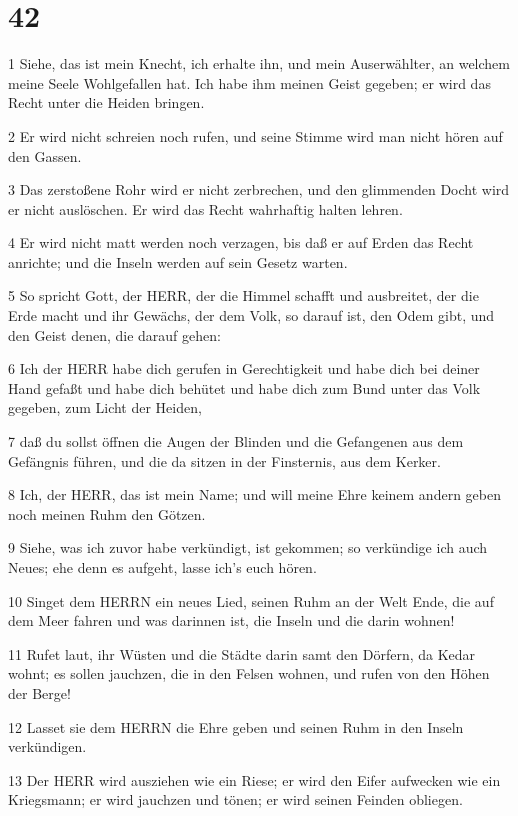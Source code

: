 \chapter{42}

\par 1 Siehe, das ist mein Knecht, ich erhalte ihn, und mein Auserwählter, an welchem meine Seele Wohlgefallen hat. Ich habe ihm meinen Geist gegeben; er wird das Recht unter die Heiden bringen.
\par 2 Er wird nicht schreien noch rufen, und seine Stimme wird man nicht hören auf den Gassen.
\par 3 Das zerstoßene Rohr wird er nicht zerbrechen, und den glimmenden Docht wird er nicht auslöschen. Er wird das Recht wahrhaftig halten lehren.
\par 4 Er wird nicht matt werden noch verzagen, bis daß er auf Erden das Recht anrichte; und die Inseln werden auf sein Gesetz warten.
\par 5 So spricht Gott, der HERR, der die Himmel schafft und ausbreitet, der die Erde macht und ihr Gewächs, der dem Volk, so darauf ist, den Odem gibt, und den Geist denen, die darauf gehen:
\par 6 Ich der HERR habe dich gerufen in Gerechtigkeit und habe dich bei deiner Hand gefaßt und habe dich behütet und habe dich zum Bund unter das Volk gegeben, zum Licht der Heiden,
\par 7 daß du sollst öffnen die Augen der Blinden und die Gefangenen aus dem Gefängnis führen, und die da sitzen in der Finsternis, aus dem Kerker.
\par 8 Ich, der HERR, das ist mein Name; und will meine Ehre keinem andern geben noch meinen Ruhm den Götzen.
\par 9 Siehe, was ich zuvor habe verkündigt, ist gekommen; so verkündige ich auch Neues; ehe denn es aufgeht, lasse ich's euch hören.
\par 10 Singet dem HERRN ein neues Lied, seinen Ruhm an der Welt Ende, die auf dem Meer fahren und was darinnen ist, die Inseln und die darin wohnen!
\par 11 Rufet laut, ihr Wüsten und die Städte darin samt den Dörfern, da Kedar wohnt; es sollen jauchzen, die in den Felsen wohnen, und rufen von den Höhen der Berge!
\par 12 Lasset sie dem HERRN die Ehre geben und seinen Ruhm in den Inseln verkündigen.
\par 13 Der HERR wird ausziehen wie ein Riese; er wird den Eifer aufwecken wie ein Kriegsmann; er wird jauchzen und tönen; er wird seinen Feinden obliegen.
